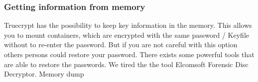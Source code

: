 \subsubsection{Getting information from memory}
Truecrypt has the possibility to keep key information in the memory. This allows you to mount containers, which are encrypted with the same password / Keyfile without to re-enter the password. But if you are not careful with this option others persons could restore your password. There exists some powerful tools that are able to restore the passwords. We tired the the tool Elcomsoft Forensic Disc Decryptor.
\cite{elcomsoft:forensicDiskDecrypt}
Memory dump


